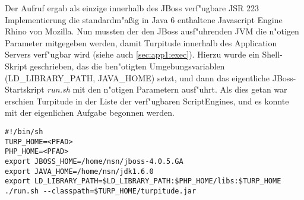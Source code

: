 Der Aufruf ergab als einzige innerhalb des JBoss verf"ugbare JSR 223 Implementierung die standardm"a\ss ig in Java 6
enthaltene Javascript Engine Rhino von Mozilla. Nun mussten der den JBoss ausf"uhrenden JVM die n"otigen Parameter
mitgegeben werden, damit Turpitude innerhalb des Application Servers verf"ugbar wird (siehe auch \ref{sec:app1:exec}). 
Hierzu wurde ein Shell-Skript geschrieben, das die ben"otigten Umgebungsvariablen (LD\_LIBRARY\_PATH, JAVA\_HOME) setzt, 
und dann das eigentliche JBoss-Startskript \emph{run.sh} mit den n"otigen Parametern ausf"uhrt. 
Als dies getan war erschien Turpitude in der Liste der verf"ugbaren ScriptEngines, und es konnte mit der eigenlichen
Aufgabe begonnen werden.
\begin{lstlisting}[caption=JBoss Startskript]
#!/bin/sh
TURP_HOME=<PFAD>
PHP_HOME=<PFAD>
export JBOSS_HOME=/home/nsn/jboss-4.0.5.GA
export JAVA_HOME=/home/nsn/jdk1.6.0
export LD_LIBRARY_PATH=$LD_LIBRARY_PATH:$PHP_HOME/libs:$TURP_HOME
./run.sh --classpath=$TURP_HOME/turpitude.jar
\end{lstlisting}


